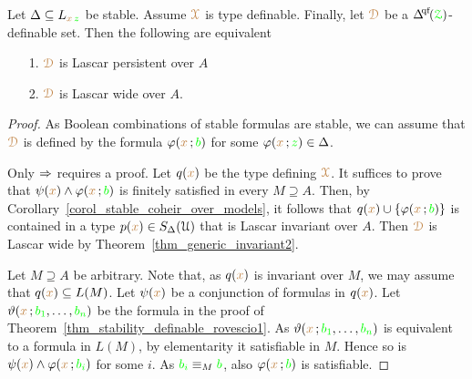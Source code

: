 \begin{corollary}\label{corol_persistent_finsat}
  Let $\Delta\subseteq L_{{\color{brown} x}\,{\color{green} z}}$ be stable.
  Assume ${\color{brown}\EuScript X}$ is type definable.
  Finally, let ${\color{brown}\EuScript D}$ be a $\qfDelta(\grZ)$-definable set.
  Then the following are equivalent 
  \begin{itemize}
    \item[1.] ${\color{brown}\EuScript D}$ is Lascar persistent over $A$
    \item[2.] ${\color{brown}\EuScript D}$ is Lascar wide over $A$. 
  \end{itemize}
\end{corollary}
\begin{proof}
  As Boolean combinations of stable formulas are stable, we can assume that ${\color{brown}\EuScript D}$ is defined by the formula $\varphi({\color{brown} x}\,;{\color{green} b})$ for some $\varphi({\color{brown} x}\,;{\color{green} z})\in\Delta$.

  Only $\Rightarrow$ requires a proof.
  Let $q({\color{brown} x})$ be the type defining ${\color{brown}\EuScript X}$.
  It suffices to prove that $\psi({\color{brown} x})\wedge\varphi({\color{brown} x}\,;{\color{green} b})$ is finitely satisfied in every $M\supseteq A$.
  Then, by Corollary~\ref{corol_stable_coheir_over_models}, it follows that $q({\color{brown} x})\cup\{\varphi({\color{brown} x}\,;{\color{green} b})\}$ is contained in a type $p({\color{brown} x})\in S_\Delta(\EuScript U)$ that is Lascar invariant over $A$.
  Then ${\color{brown}\EuScript D}$ is Lascar wide by Theorem~\ref{thm_generic_invariant2}.
  
  Let $M\supseteq A$ be arbitrary.
  Note that, as $q({\color{brown} x})$ is invariant over $M$, we may assume that $q({\color{brown} x})\subseteq L(M)$.
  Let $\psi({\color{brown} x})$ be a conjunction of formulas in $q({\color{brown} x})$. 
  Let $\vartheta({\color{brown} x}\,;{\color{green} b_1},\dots,{\color{green} b_n})$ be the formula in the proof of Theorem~\ref{thm_stability_definable_rovescio1}.
  As $\vartheta({\color{brown} x}\,;{\color{green} b_1},\dots,{\color{green} b_n})$ is equivalent to a formula in $L(M)$, by elementarity it satisfiable in $M$.
  Hence so is $\psi({\color{brown} x})\wedge\varphi({\color{brown} x}\,;{\color{green} b_i})$ for some $i$.
  As ${\color{green} b_i}\equiv_M{\color{green} b}$, also $\varphi({\color{brown} x}\,;{\color{green} b})$ is satisfiable.
\end{proof}


